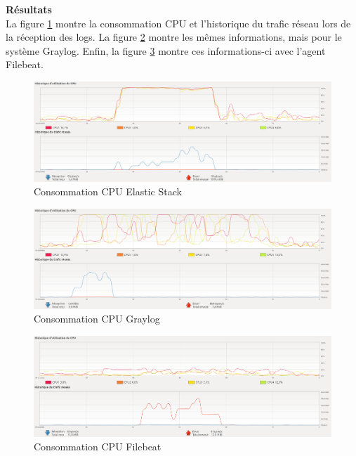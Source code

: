 \documentclass[paper=a4, fontsize=11pt]{scrartcl}
\begin{document}
\textbf{Résultats} \\
La figure \ref{f-ElasticCPU} montre la consommation CPU et l'historique du trafic réseau lors de la réception des logs. La figure \ref{f-GraylogCPU} montre les mêmes informations, mais pour le système Graylog. Enfin, la figure \ref{f-FilebeatCPU} montre ces informations-ci avec l'agent Filebeat.

\begin{figure}[H]
    \centering
    \includegraphics[width=18cm]{img/screenshots/Elastic_CPU_MEM_Receive_modified.png}
    \caption{Consommation CPU Elastic Stack}
    \label{f-ElasticCPU}
\end{figure}

\begin{figure}[H]
    \centering
    \includegraphics[width=18cm]{img/screenshots/Graylog_CPU_MEM_Receive_modified.png}
    \caption{Consommation CPU Graylog}
    \label{f-GraylogCPU}
\end{figure}

\begin{figure}[H]
    \centering
    \includegraphics[width=18cm]{img/screenshots/Filebeat_send_modified.png}
    \caption{Consommation CPU Filebeat}
    \label{f-FilebeatCPU}
\end{figure}
\end{document}
